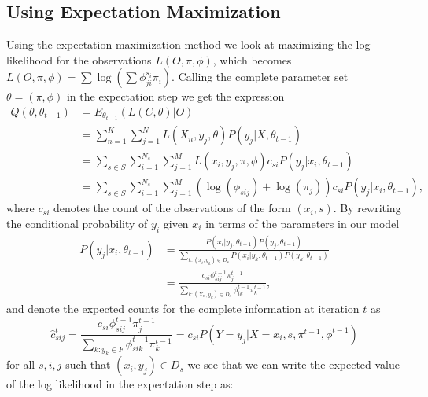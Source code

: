 \subsection{Using Expectation Maximization}
Using the expectation maximization method we look at maximizing the log-likelihood for the observations $L(O,\pi,\phi)$, which becomes $L(O,\pi,\phi)=\sum \log (\sum \phi_{ji}^{s_i}\pi_i)$. Calling the complete parameter set $\theta = (\pi, \phi)$ in the expectation step we get the expression 
\begin{equation*}
\begin{split}
Q(\theta,\theta_{t-1})%
&=E_{\theta_{t-1}}\left ( L(C,\theta) | O \right )\\
&= \sum_{n=1}^K \sum_{j=1}^N
L(X_n, y_j,\theta)
P(y_j|X,\theta_{t-1})\\
&= \sum_{s \in S} \sum_{i=1}^{N_s} \sum_{j=1}^M 
L(x_i,y_j,\pi,\phi)
c_{si}P(y_j|x_i,\theta_{t-1})\\
&= \sum_{s \in S} \sum_{i=1}^{N_s} \sum_{j=1}^M 
(\log(\phi_{sij}) + \log(\pi_j))
c_{si}P(y_j|x_i,\theta_{t-1}),
\end{split}
\end{equation*}
where $c_{si}$ denotes the count of the observations of the form $(x_i,s)$. By rewriting the conditional probability of $y_i$ given $x_i$ in terms of the parameters in our model
\begin{equation*}
\begin{split}
P(y_j|x_i,\theta_{t-1})
&=\frac{P(x_i|y_j,\theta_{t-1})P(y_j,\theta_{t-1})}
{\sum_{k:(x_i,y_k)\in D_s}P(x_i|y_k,\theta_{t-1})P(y_k,\theta_{t-1})}\\
&=\frac{c_{si}\phi^{t-1}_{sij}\pi^{t-1}_{j}}
{\sum_{k:(X_n,y_k)\in D_{s}}\phi^{t-1}_{ik}\pi^{t-1}_{k}},
\end{split}
\end{equation*}
and denote the expected counts for the complete information at iteration $t$ as 
\begin{equation*}
\label{eq:expected_counts}
\hat c^t_{sij} = \frac{c_{si}\phi^{t-1}_{sij}\pi^{t-1}_{j}}{\sum_{k: y_k \in F}\phi^{t-1}_{sik}\pi^{t-1}_{k}} = c_{si}P(Y=y_j|X=x_i,s,\pi^{t-1}, \phi^{t-1})
\end{equation*}
for all $s,i,j$ such that $(x_i,y_j)\in D_s$ we see that we can write the expected value of the log likelihood in the expectation step as:
